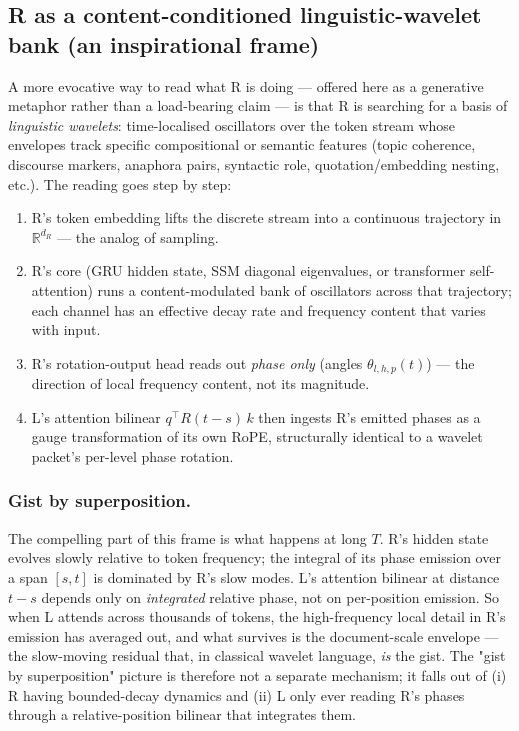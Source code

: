 \documentclass[10pt, twocolumn, a4paper]{article}
\begin{document}
\subsection*{R as a content-conditioned linguistic-wavelet bank (an inspirational frame)}

A more evocative way to read what R is doing --- offered here as a generative metaphor rather than a load-bearing claim --- is that R is searching for a basis of \emph{linguistic wavelets}: time-localised oscillators over the token stream whose envelopes track specific compositional or semantic features (topic coherence, discourse markers, anaphora pairs, syntactic role, quotation/embedding nesting, etc.). The reading goes step by step:
\begin{enumerate}[nosep,leftmargin=1.5em]
\item R's token embedding lifts the discrete stream into a continuous trajectory in $\mathbb{R}^{d_R}$ --- the analog of sampling.
\item R's core (GRU hidden state, SSM diagonal eigenvalues, or transformer self-attention) runs a content-modulated bank of oscillators across that trajectory; each channel has an effective decay rate and frequency content that varies with input.
\item R's rotation-output head reads out \emph{phase only} (angles $\theta_{l,h,p}(t)$) --- the direction of local frequency content, not its magnitude.
\item L's attention bilinear $q^\top R(t-s)\,k$ then ingests R's emitted phases as a gauge transformation of its own RoPE, structurally identical to a wavelet packet's per-level phase rotation.
\end{enumerate}

\subsubsection*{Gist by superposition.} The compelling part of this frame is what happens at long $T$. R's hidden state evolves slowly relative to token frequency; the integral of its phase emission over a span $[s, t]$ is dominated by R's slow modes. L's attention bilinear at distance $t-s$ depends only on \emph{integrated} relative phase, not on per-position emission. So when L attends across thousands of tokens, the high-frequency local detail in R's emission has averaged out, and what survives is the document-scale envelope --- the slow-moving residual that, in classical wavelet language, \emph{is} the gist. The "gist by superposition" picture is therefore not a separate mechanism; it falls out of (i) R having bounded-decay dynamics and (ii) L only ever reading R's phases through a relative-position bilinear that integrates them.
\end{document}
